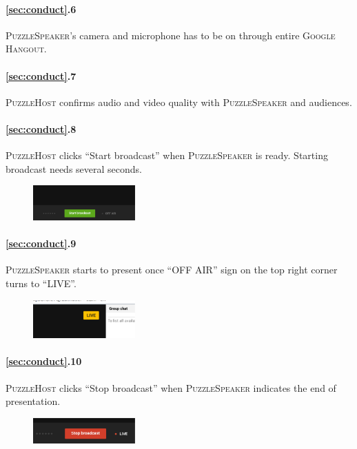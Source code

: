 \documentclass{article}
\newcommand{\hangout}{\textsc{Google Hangout}\xspace}
\newcommand{\host}{\textsc{PuzzleHost}\xspace}
\newcommand{\speaker}{\textsc{PuzzleSpeaker}\xspace}
\begin{document}
\paragraph{\ref{sec:conduct}.6} \speaker's camera and microphone has to be on through entire \hangout.

\paragraph{\ref{sec:conduct}.7} \host confirms audio and video quality with \speaker and audiences.

\paragraph{\ref{sec:conduct}.8} \host clicks ``Start broadcast'' when \speaker is ready. Starting broadcast needs several seconds.

\begin{figure}[!htm]
\centering
\includegraphics[width=0.35\textwidth]{images/sop_start_broadcast.eps}
\end{figure}

\paragraph{\ref{sec:conduct}.9} \speaker starts to present once ``OFF AIR'' sign on the top right corner turns to ``LIVE''.

\begin{figure}[!htm]
\centering
\includegraphics[width=0.35\textwidth]{images/sop_live.eps}
\end{figure}

\paragraph{\ref{sec:conduct}.10} \host clicks ``Stop broadcast'' when \speaker indicates the end of presentation.

\begin{figure}[!htm]
\centering
\includegraphics[width=0.35\textwidth]{images/sop_stop_broadcast.eps}
\end{figure}
\end{document}
